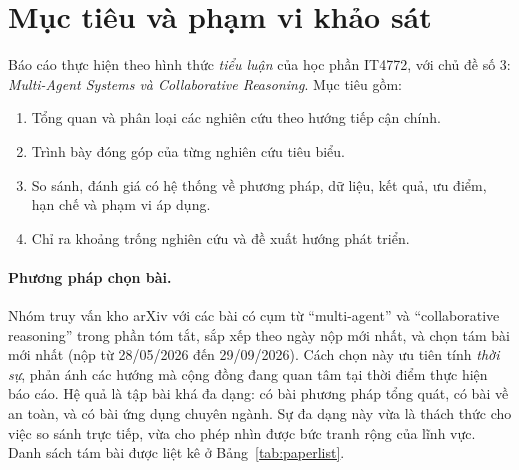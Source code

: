 \section{Mục tiêu và phạm vi khảo sát}

Báo cáo thực hiện theo hình thức \emph{tiểu luận} của học phần IT4772, với chủ đề số 3: \emph{Multi-Agent Systems và Collaborative Reasoning}. Mục tiêu gồm:
\begin{enumerate}
  \item Tổng quan và phân loại các nghiên cứu theo hướng tiếp cận chính.
  \item Trình bày đóng góp của từng nghiên cứu tiêu biểu.
  \item So sánh, đánh giá có hệ thống về phương pháp, dữ liệu, kết quả, ưu điểm, hạn chế và phạm vi áp dụng.
  \item Chỉ ra khoảng trống nghiên cứu và đề xuất hướng phát triển.
\end{enumerate}

\paragraph{Phương pháp chọn bài.} Nhóm truy vấn kho arXiv với các bài có cụm từ ``multi-agent'' và ``collaborative reasoning'' trong phần tóm tắt, sắp xếp theo ngày nộp mới nhất, và chọn tám bài mới nhất (nộp từ 28/05/2026 đến 29/09/2026). Cách chọn này ưu tiên tính \emph{thời sự}, phản ánh các hướng mà cộng đồng đang quan tâm tại thời điểm thực hiện báo cáo. Hệ quả là tập bài khá đa dạng: có bài phương pháp tổng quát, có bài về an toàn, và có bài ứng dụng chuyên ngành. Sự đa dạng này vừa là thách thức cho việc so sánh trực tiếp, vừa cho phép nhìn được bức tranh rộng của lĩnh vực. Danh sách tám bài được liệt kê ở Bảng~\ref{tab:paperlist}.

